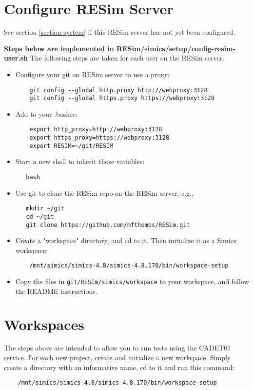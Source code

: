 \documentclass[titlepage]{article}
\begin{document}
\section{Configure RESim Server}
See section \ref{section-system} if this RESim server has not yet been configured.

\textbf{Steps below are implemented in RESim/simics/setup/config-resim-user.sh}
The following steps are taken for each user on the RESim server.
\begin{itemize}
\item Configure your git on RESim server to use a proxy:
\begin{verbatim}
    git config --global http.proxy http://webproxy:3128
    git config --global https.proxy https://webproxy:3128
\end{verbatim}

\item Add to your .bashrc:
\begin{verbatim}
    export http_proxy=http://webproxy:3128
    export https_proxy=https://webproxy:3128
    export RESIM=~/git/RESIM
\end{verbatim}
\item Start a new shell to inherit those variables:
\begin{verbatim}
   bash
\end{verbatim}

\item Use git to clone the RESim repo on the RESim server, e.g., 
\begin{verbatim}
   mkdir ~/git
   cd ~/git
   git clone https://github.com/mfthomps/RESim.git
\end{verbatim}

\item Create a "workspace" directory, and cd to it.  Then initialize
it as a Simics workspace:
\begin{verbatim}
    /mnt/simics/simics-4.8/simics-4.8.170/bin/workspace-setup
\end{verbatim}


\item Copy the files in {\tt git/RESim/simics/workspace} to your workspace, and follow the README instructions.
\end{itemize}

\section{Workspaces}
The steps above are intended to allow you to run tests using the CADET01 service. 
For each new project, create and initialize a new workspace.  Simply create a directory
with an informative name, cd to it and run this command:
\begin{verbatim}
    /mnt/simics/simics-4.8/simics-4.8.170/bin/workspace-setup
\end{verbatim}
\end{document}
